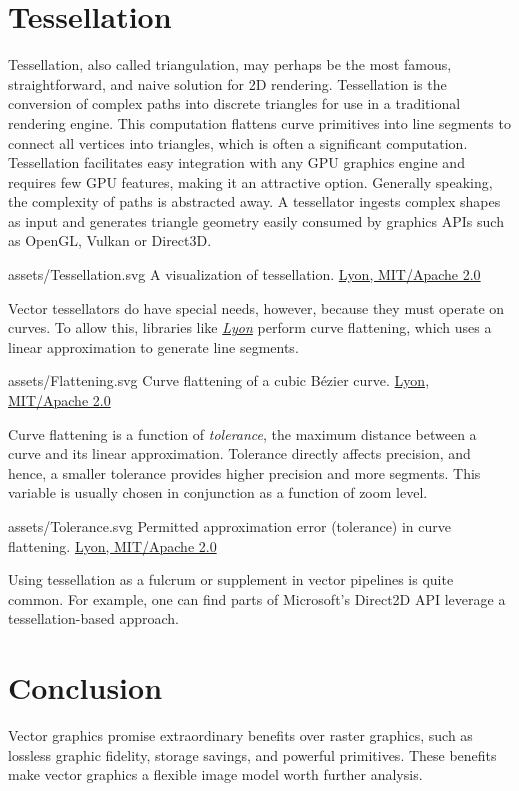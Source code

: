 \section{Tessellation}\label{sec:tessellation}
Tessellation, also called triangulation, may perhaps be the most famous, straightforward, and naive solution for 2D rendering. Tessellation is the conversion of complex paths into discrete triangles for use in a traditional rendering engine. This computation flattens curve primitives into line segments to connect all vertices into triangles, which is often a significant computation. Tessellation facilitates easy integration with any GPU graphics engine and requires few GPU features, making it an attractive option. Generally speaking, the complexity of paths is abstracted away. A tessellator ingests complex shapes as input and generates triangle geometry easily consumed by graphics APIs such as OpenGL, Vulkan or Direct3D.\medskip

\svg
{assets/Tessellation.svg}
{A visualization of tessellation.}
{\href{https://github.com/nical/lyon/blob/540a29c3726cdc79ffeb8a7ac3fbc793e63dc87b/crates/geom/src/lib.rs\#L24}{Lyon, MIT/Apache 2.0}}
\medskip

Vector tessellators do have special needs, however, because they must operate on curves. To allow this, libraries like \href{https://github.com/nical/lyon}{\textit{Lyon}} perform curve flattening, which uses a linear approximation to generate line segments\cite{Silva18}.\medskip

\smallsvg
{assets/Flattening.svg}
{Curve flattening of a cubic Bézier curve.}
{\href{https://github.com/nical/lyon/blob/540a29c3726cdc79ffeb8a7ac3fbc793e63dc87b/crates/geom/src/lib.rs\#L24}{Lyon, MIT/Apache 2.0}}\medskip

Curve flattening is a function of \textit{tolerance}, the maximum distance between a curve and its linear approximation. Tolerance directly affects precision, and hence, a smaller tolerance provides higher precision and more segments. This variable is usually chosen in conjunction as a function of zoom level.\medskip

\widesvg
{assets/Tolerance.svg}
{Permitted approximation error (tolerance) in curve flattening.}
{\href{https://github.com/nical/lyon/blob/1c391badb70f8d5d23b45ecb4577f54a5c777122/crates/tessellation/src/lib.rs\#L10}{Lyon, MIT/Apache 2.0}}\medskip

Using tessellation as a fulcrum or supplement in vector pipelines is quite common. For example, one can find parts of Microsoft's Direct2D API\cite{D2D_Tess} leverage a tessellation-based approach.

\section{Conclusion}
Vector graphics promise extraordinary benefits over raster graphics, such as lossless graphic fidelity, storage savings, and powerful primitives. These benefits make vector graphics a flexible image model worth further analysis.